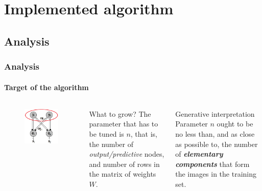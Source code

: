 \documentclass{beamer}
\begin{document}
		
	\section{Implemented algorithm}
		\subsection{Analysis}
			\begin{frame}
				\frametitle{Analysis}
				\framesubtitle{Target of the algorithm}
				\begin{columns}[c]
						\begin{figure}[h]
							\centering
							\includegraphics[width=\textwidth]{dim_predictive}
						\end{figure}
						\begin{block}{What to grow?}
							The parameter that has to be tuned is $n$, that is, the number of \emph{output/predictive} nodes, and number of rows in the matrix of weights $W$.
						\end{block}
						\begin{exampleblock}{Generative interpretation}
							Parameter $n$ ought to be no less than, and as close as possible to, the number of \emph{\textbf{elementary components}} that form the images in the training set.
						\end{exampleblock}
				\end{columns}
			\end{frame}
		
\end{document}
